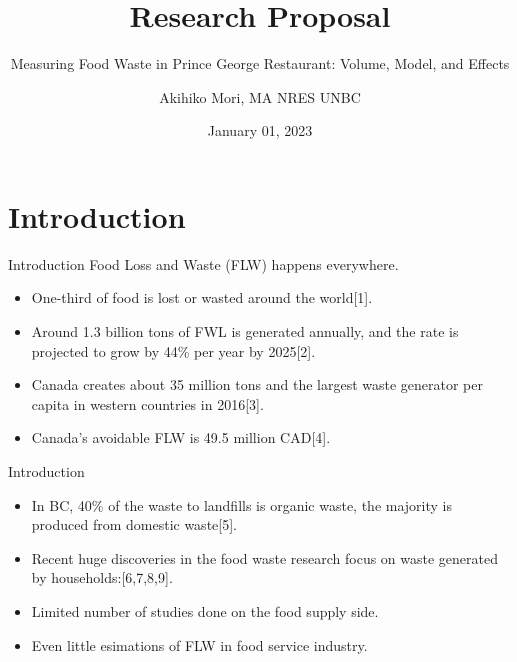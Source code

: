\documentclass[
  ignorenonframetext,
]{beamer}
\title{Research Proposal}
\subtitle{Measuring Food Waste in Prince George Restaurant: Volume,
Model, and Effects}
\author{Akihiko Mori, MA NRES UNBC}
\date{January 01, 2023}
\providecommand{\tightlist}{%
  \setlength{\itemsep}{0pt}\setlength{\parskip}{0pt}}
\begin{document}
\frame{\titlepage}

\begin{frame}[allowframebreaks]
  \tableofcontents[hideallsubsections]
\end{frame}
\hypertarget{introduction}{%
\section{Introduction}\label{introduction}}

\begin{frame}{Introduction}
\protect\hypertarget{introduction-1}{}
Food Loss and Waste (FLW) happens everywhere.

\begin{itemize}
\tightlist
\item
  One-third of food is lost or wasted around the world{[}1{]}.
\item
  Around 1.3 billion tons of FWL is generated annually, and the rate is
  projected to grow by 44\% per year by 2025{[}2{]}.
\end{itemize}

\begin{itemize}
\tightlist
\item
  Canada creates about 35 million tons and the largest waste generator
  per capita in western countries in 2016{[}3{]}.
\item
  Canada's avoidable FLW is 49.5 million CAD{[}4{]}.
\end{itemize}
\end{frame}

\begin{frame}{Introduction}
\protect\hypertarget{introduction-2}{}
\begin{itemize}
\tightlist
\item
  In BC, 40\% of the waste to landfills is organic waste, the majority
  is produced from domestic waste{[}5{]}.
\end{itemize}

\begin{itemize}
\tightlist
\item
  Recent huge discoveries in the food waste research focus on waste
  generated by households:{[}6,7,8,9{]}.
\end{itemize}

\begin{itemize}
\tightlist
\item
  Limited number of studies done on the food supply side.
\item
  Even little esimations of FLW in food service industry.
\end{itemize}
\end{frame}
\end{document}
